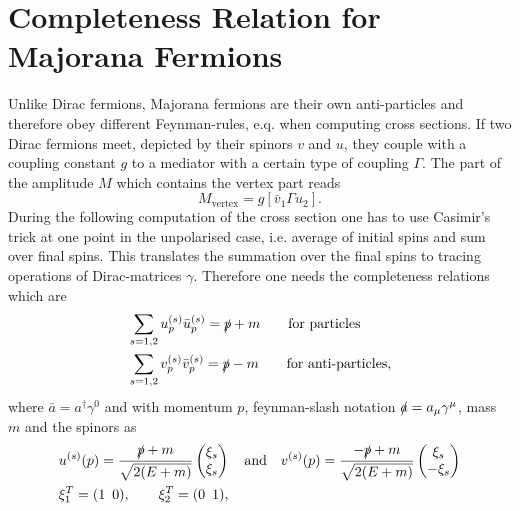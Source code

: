 \documentclass[11pt,a4paper,twoside]{article}
\begin{document}
\section*{Completeness Relation for Majorana Fermions}
Unlike Dirac fermions, Majorana fermions are their own anti-particles and therefore obey different Feynman-rules, e.q. when computing cross sections.
If two Dirac fermions meet, depicted by their spinors $v$ and $u$, they couple with a coupling constant $g$ to a mediator with a certain type of coupling
$\Gamma$. The part of the amplitude $M$ which contains the vertex part reads
\begin{equation}
 M_\text{vertex} = g\left[\bar v_1 \Gamma u_2\right].
\end{equation}
% 
During the following computation of the cross section one has to use Casimir's trick at one point in the unpolarised case, i.e. average of initial spins and
sum over final spins. This translates the summation over the final spins to tracing operations of Dirac-matrices $\gamma$. Therefore one needs the completeness 
relations which are
\begin{align}
 &\sum_{s=1,2} u_p^{(s)} \bar u_p^{(s)} = \slashed{p} + m \qquad \text{for particles} \\
 &\sum_{s=1,2} v_p^{(s)} \bar v_p^{(s)} = \slashed{p} - m \qquad \text{for anti-particles},
\end{align}
where $\bar a = a^\dagger \gamma^0$ and with momentum $p$, feynman-slash notation $\slashed{a}=a_\mu\gamma^\mu$, mass $m$ and the spinors as
\begin{align}
 &u^{(s)}(p) = \frac{\slashed{p}+m}{\sqrt{2(E+m)}} \begin{pmatrix}
                                             \xi_s \\ \xi_s
                                            \end{pmatrix}\quad \text{and}\quad  v^{(s)}(p) = \frac{-\slashed{p}+m}{\sqrt{2(E+m)}} \begin{pmatrix}
                                             \xi_s \\ -\xi_s
                                            \end{pmatrix}\\
 &\xi_1^T = (1\,\,\,0), \qquad \xi_2^T = (0\,\,\,1), \qquad 
 \label{eq_spinors}
\end{align}
\end{document}
